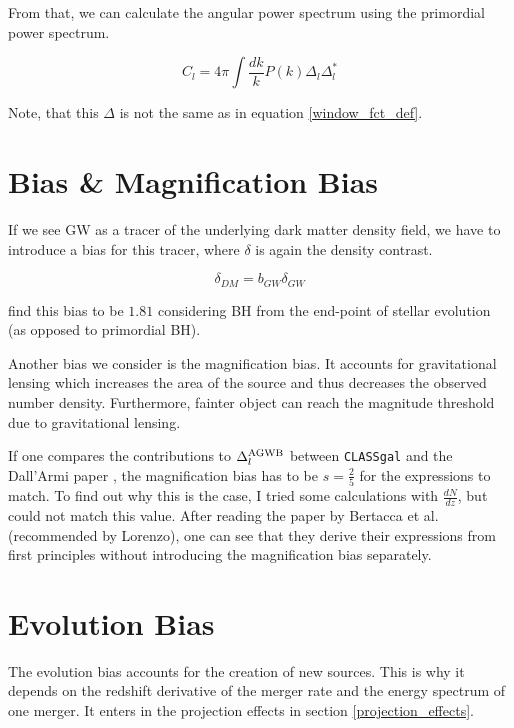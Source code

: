 From that, we can calculate the angular power spectrum using the primordial power 
spectrum.

\begin{equation}
    C_l = 4\pi \int \frac{dk}{k} P(k) \Delta_l \Delta_l^*
\end{equation}

Note, that this $\Delta$ is not the same as in equation \ref{window_fct_def}.


\section{Bias \& Magnification Bias}

If we see GW as a tracer of the underlying dark matter density field, we have to introduce a bias for this tracer, where $\delta$ is again the density contrast.

\begin{equation}
    \delta_{DM}=b_{GW}\delta_{GW}
\end{equation}

\cite{scelfo_gwtimeslss_2018} find this bias to be $1.81$ considering BH from the end-point of stellar evolution (as opposed to primordial BH).

Another bias we consider is the magnification bias. It accounts for gravitational lensing which increases the area of the source and thus decreases the observed number density. Furthermore, fainter object can reach the magnitude threshold due to gravitational lensing.

If one compares the contributions to $\Delta_l^{\rm{AGWB}}$ between {\tt CLASSgal} and the Dall'Armi paper \cite{dallarmi_dipole_2022}, the magnification bias has to be  $s=\frac{2}{5}$ for the expressions to match. To find out why this is the case, I tried some calculations with $\frac{dN}{dz}$, but could not match this value.  After reading the paper by Bertacca et al. \cite{bertacca_projection_2020} (recommended by Lorenzo), one can see that they derive their expressions from 
first principles without introducing the magnification bias separately. 

\section{Evolution Bias}
\label{evo_bias_section}
The evolution bias accounts for the creation of new sources. This is why it depends on the redshift derivative of the merger rate and the energy spectrum of one merger. 
It enters in the projection effects in section \ref{projection_effects}.

